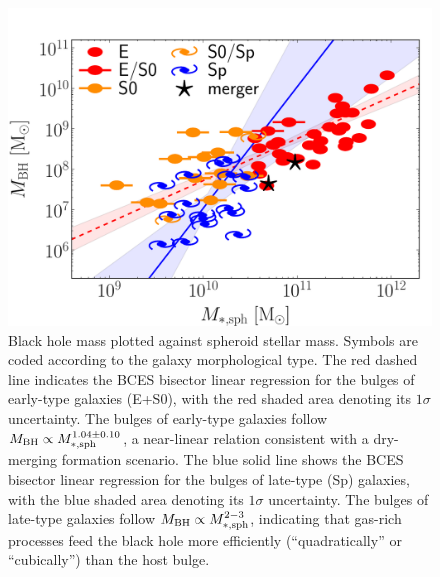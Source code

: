 \documentclass[preprint2]{emulateapj}
\begin{document}
\begin{figure}[h]
\begin{center}
\includegraphics[width=\columnwidth]{images/mbh_vs_mass_sph.pdf}
\caption{Black hole mass plotted against spheroid stellar mass. 
Symbols are coded according to the galaxy morphological type.
The red dashed line indicates the BCES bisector linear regression for the bulges of early-type galaxies (E+S0), 
with the red shaded area denoting its $1\sigma$ uncertainty. 
The bulges of early-type galaxies follow $M_{\rm BH} \propto M_{\rm *,sph}^{1.04 \pm 0.10}$,
a near-linear relation consistent with a dry-merging formation scenario.
The blue solid line shows the BCES bisector linear regression for the bulges of late-type (Sp) galaxies, 
with the blue shaded area denoting its $1\sigma$ uncertainty. 
The bulges of late-type galaxies follow $M_{\rm BH} \propto M_{\rm *,sph}^{2-3}$, 
indicating that gas-rich processes feed the black hole more efficiently (``quadratically'' or ``cubically'') than the host bulge. }
\label{fig:mbhmasssph}
\end{center}
\end{figure}
\end{document}

